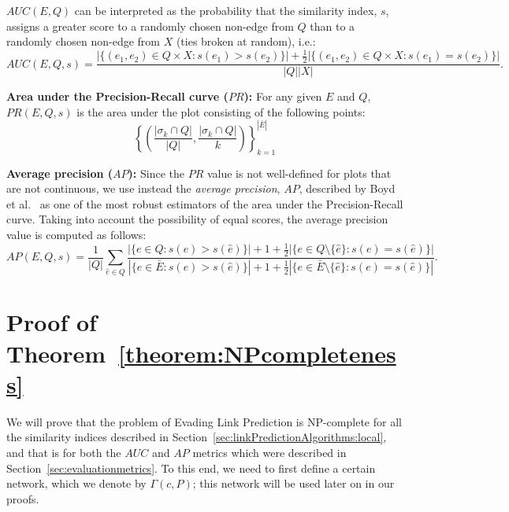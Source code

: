\documentclass[twocolumn]{article}
\newcommand{\ROC}{\mathit{AUC}}
\newcommand{\PR}{\mathit{PR}}
\newcommand{\AP}{\mathit{AP}}
\newcommand{\ER}{\bar{E}}
\begin{document}
\noindent $\ROC(E,Q)$ can be interpreted as the probability that the similarity index, $s$, assigns a greater score to a randomly chosen non-edge from $Q$ than to a randomly chosen non-edge from $X$ (ties broken at random), i.e.:
$$
\ROC(E,Q,s)=\frac{|\{(e_1,e_2) \in Q \times X : s(e_1) > s(e_2)\}| + \frac{1}{2}|\{(e_1,e_2) \in Q \times X : s(e_1) = s(e_2)\}|}{|Q||X|}.
$$


\smallskip\smallskip
\noindent\textbf{Area under the Precision-Recall curve ($\PR$):} For any given $E$ and $Q$, $\PR(E,Q, s)$ is the area under the plot consisting of the following points:
$$
\left\{\left(\frac{|\sigma_k \cap Q|}{|Q|}, \frac{|\sigma_k \cap Q|}{k}\right)\right\}_{k=1}^{|\ER|}
$$

\smallskip\smallskip
\noindent\textbf{Average precision ($\AP$):} Since the $\PR$ value is not well-defined for plots that are not continuous, we use instead the \emph{average precision}, $\AP$, described by Boyd et al.~\cite{boyd2013area} as one of the most robust estimators of the area under the Precision-Recall curve. Taking into account the possibility of equal scores, the average precision value is computed as follows:
$$
\AP(E,Q,s) = \frac{1}{|Q|} \sum_{\widehat{e} \in Q} \frac{|\{e \in Q : s(e) > s(\widehat{e})\}| + 1 + \frac{1}{2}|\{e \in Q \setminus \{\widehat{e}\} : s(e) = s(\widehat{e})\}|}{|\{e \in \ER : s(e) > s(\widehat{e})\}| +  1 + \frac{1}{2}|\{e \in \ER \setminus \{\widehat{e}\} : s(e) = s(\widehat{e})\}|}.
$$




\clearpage
\section{Proof of Theorem~\ref{theorem:NPcompleteness}}\label{appendix:proof:NPcompleteness}

\noindent We will prove that the problem of Evading Link Prediction is NP-complete for all the similarity indices described in Section~\ref{sec:linkPredictionAlgorithms:local}, and that is for both the $\ROC$ and $\AP$ metrics which were described in Section~\ref{sec:evaluationmetrics}. To this end, we need to first define a certain network, which we denote by $\Gamma(c,P)$; this network will be used later on in our proofs.
\end{document}
